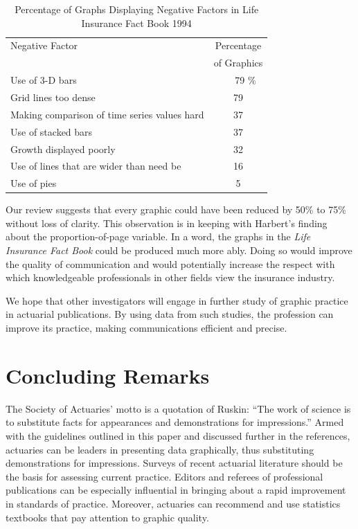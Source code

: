 \begin{table}[h] 
\caption{\label{T21:GraphsFactors} Percentage of Graphs Displaying
Negative Factors \newline in Life Insurance Fact Book 1994}
\begin{tabular}{lc}
\hline
 Negative Factor &Percentage \\ &of Graphics \\ \hline Use of 3-D bars & ~~~79 \%
 \\
Grid lines too dense &79 \\
 Making comparison of time series values
hard &37\\
 Use of stacked bars & 37 \\
 Growth displayed poorly &32\\
 Use of
lines that are wider than need be& 16\\ Use of pies &5\\ \hline
\end{tabular}
\end{table}




Our review suggests that every graphic could have been reduced by
50\% to 75\% without loss of clarity. This observation is in keeping
with Harbert's finding about the proportion-of-page variable. In a
word, the graphs in the \emph{Life Insurance Fact Book} could be
produced much more ably. Doing so would improve the quality of
communication and would potentially increase the respect with which
knowledgeable professionals in other fields view the insurance
industry.

We hope that other investigators will engage in further study of
graphic practice in actuarial publications. By using data from such
studies, the profession can improve its practice, making
communications efficient and precise.

\section{Concluding Remarks}\label{S21:Conclude}

The Society of Actuaries' motto is a quotation of Ruskin: ``The work
of science is to substitute facts for appearances and demonstrations
for impressions.'' Armed with the guidelines outlined in this paper
and discussed further in the references, actuaries can be leaders in
presenting data graphically, thus substituting demonstrations for
impressions. Surveys of recent actuarial literature should be the
basis for assessing current practice. Editors and referees of
professional publications can be especially influential in bringing
about a rapid improvement in standards of practice. Moreover,
actuaries can recommend and use statistics textbooks that pay
attention to graphic quality.

